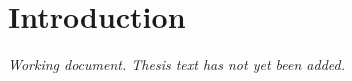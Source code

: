 \section{Introduction}
\label{sec:introduction}

\emph{Working document. Thesis text has not yet been added.}
